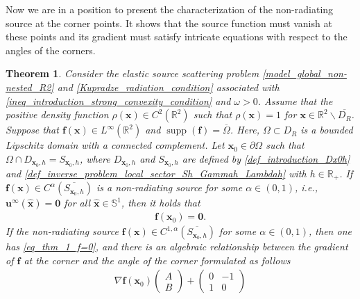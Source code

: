 \documentclass[11pt,reqno,oneside]{amsart}
\newtheorem{theorem}{Theorem}[section]
\theoremstyle{definition}
\theoremstyle{remark}
\numberwithin{equation}{section}
\numberwithin{equation}{section}
\theoremstyle{remark}
\DeclareMathOperator{\supp}{supp}
\begin{document}
Now we are in a position to present the characterization of the non-radiating source at the corner points. It shows that the source function must vanish at these points and its gradient must satisfy intricate equations with respect to the angles of the corners. 

\begin{theorem} \label{thm_inverse_problem_non-radiating}
	Consider the elastic source scattering problem \eqref{model_global_non-nested_R2} and \eqref{Kupradze_radiation_condition} associated with \eqref{ineq_introduction_strong_convexity_condition} and $ \omega > 0 $. Assume that the positive density function $ \rho\left(\mathbf{x}\right)\in C^2\left(\mathbb{R}^2\right) $ such that $ \rho\left(\mathbf{x}\right)=1 $ for $ \mathbf{x}\in\mathbb{R}^2 \backslash \overline{D_R} $. Suppose that $ \mathbf{f}\left(\mathbf{x}\right)\in L^{\infty}\left(\mathbb{R}^2\right) $ and $ \supp\left(\mathbf{f}\right)=\overline{\Omega} $. Here, $ \Omega\subset D_R $ is a bounded Lipschitz domain with a connected complement. Let $ \mathbf{x}_0\in\partial\Omega $ such that $ \Omega\cap D_{\mathbf{x}_0, h}=S_{\mathbf{x}_0, h} $, where $ D_{\mathbf{x}_0, h} $ and $ S_{\mathbf{x}_0, h} $ are defined by \eqref{def_introduction_Dx0h} and \eqref{def_inverse_problem_local_sector_Sh_Gammah_Lambdah} with $ h\in\mathbb{R}_+ $. If $ \mathbf{f}\left(\mathbf{x}\right) \in C^{\alpha} \left(\overline{S_{\mathbf{x}_0, h}}\right) $ is a non-radiating source for some $ \alpha \in \left(0,1\right) $, i.e., $ \mathbf{u}^{\infty}\left(\hat{\mathbf{x}}\right)=\bm{0} $ for all $ \hat{\mathbf{x}} \in \mathbb{S}^1 $, then it holds that 
	\begin{align} \label{eq_thm_1_f=0}
		\mathbf{f} \left(\mathbf{x}_0\right) = \bm{0}.
	\end{align}
	If the non-radiating source $ \mathbf{f}\left(\mathbf{x}\right) \in C^{1,\alpha} \left(\overline{S_{\mathbf{x}_0, h}}\right) $ for some $ \alpha \in \left(0,1\right) $, then one has \eqref{eq_thm_1_f=0}, and there is an algebraic relationship between the gradient of $\mathbf f$ at the corner and the angle of the corner formulated as follows
	\begin{align} \label{eq_thm_1_gradientf}
		\nabla\mathbf{f}\left(\mathbf{x}_0\right)
		\begin{pmatrix}
			A \\ 
			B
		\end{pmatrix}
		+
		\begin{pmatrix}
			0 & -1 \\
			1 & 0
		\end{pmatrix}

\end{align}
\end{theorem}
\end{document}
